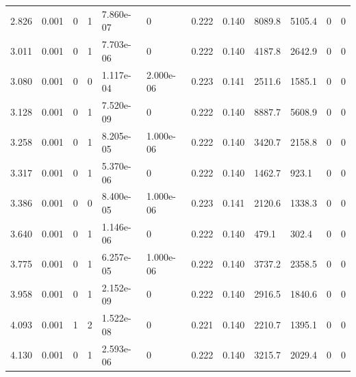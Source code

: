 \documentclass[preview]{standalone}
\begin{document}
{{\begin{tabular}{L{1.2cm}C{1.2cm} C{0.3cm}C{0.5cm} C{1.4cm}C{1.4cm} C{1.4cm}C{1.4cm} C{1.6cm}C{1.6cm} C{1.6cm}C{1.6cm}}
  2.826  &  0.001  & 0     &  1 &  7.860e-07  & 0  &  0.222&   0.140& 8089.8 & 5105.4   &  0 & 0  \\ 
  3.011  &  0.001  & 0     &  1 &  7.703e-06  & 0  &  0.222&   0.140& 4187.8 & 2642.9   &  0 & 0  \\ 
  3.080  &  0.001  & 0     &  0 &  1.117e-04  & 2.000e-06  &  0.223&   0.141& 2511.6 & 1585.1   &  0 & 0  \\ 
  3.128  &  0.001  & 0     &  1 &  7.520e-09  & 0  &  0.222&   0.140& 8887.7 & 5608.9   &  0 & 0  \\ 
  3.258  &  0.001  & 0     &  1 &  8.205e-05  & 1.000e-06  &  0.222&   0.140& 3420.7 & 2158.8   &  0 & 0  \\ 
  3.317  &  0.001  & 0     &  1 &  5.370e-06  & 0  &  0.222&   0.140& 1462.7 & 923.1   &  0 & 0  \\ 
  3.386  &  0.001  & 0     &  0 &  8.400e-05  & 1.000e-06  &  0.223&   0.141& 2120.6 & 1338.3   &  0 & 0  \\ 
  3.640  &  0.001  & 0     &  1 &  1.146e-06  & 0  &  0.222&   0.140& 479.1 & 302.4   &  0 & 0  \\ 
  3.775  &  0.001  & 0     &  1 &  6.257e-05  & 1.000e-06  &  0.222&   0.140& 3737.2 & 2358.5   &  0 & 0  \\ 
  3.958  &  0.001  & 0     &  1 &  2.152e-09  & 0  &  0.222&   0.140& 2916.5 & 1840.6   &  0 & 0  \\ 
  4.093  &  0.001  & 1     &  2 &  1.522e-08  & 0  &  0.221&   0.140& 2210.7 & 1395.1   &  0 & 0  \\ 
  4.130  &  0.001  & 0     &  1 &  2.593e-06  & 0  &  0.222&   0.140& 3215.7 & 2029.4   &  0 & 0  \\ 
\hline 
\end{tabular} 

}}
\end{document}
